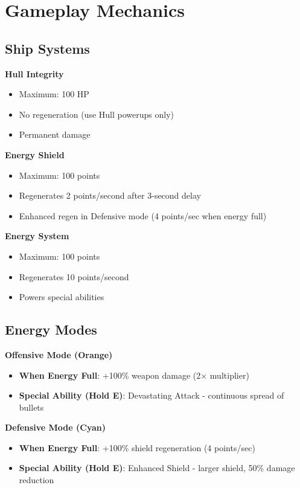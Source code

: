\documentclass[11pt,a4paper]{article}
\begin{document}
\section{Gameplay Mechanics}

\subsection{Ship Systems}

\textbf{Hull Integrity}
\begin{itemize}
    \item Maximum: 100 HP
    \item No regeneration (use Hull powerups only)
    \item Permanent damage
\end{itemize}

\textbf{Energy Shield}
\begin{itemize}
    \item Maximum: 100 points
    \item Regenerates 2 points/second after 3-second delay
    \item Enhanced regen in Defensive mode (4 points/sec when energy full)
\end{itemize}

\textbf{Energy System}
\begin{itemize}
    \item Maximum: 100 points
    \item Regenerates 10 points/second
    \item Powers special abilities
\end{itemize}

\subsection{Energy Modes}

\textbf{Offensive Mode (Orange)}
\begin{itemize}
    \item \textbf{When Energy Full}: +100\% weapon damage (2× multiplier)
    \item \textbf{Special Ability (Hold E)}: Devastating Attack - continuous spread of bullets
\end{itemize}

\textbf{Defensive Mode (Cyan)}
\begin{itemize}
    \item \textbf{When Energy Full}: +100\% shield regeneration (4 points/sec)
    \item \textbf{Special Ability (Hold E)}: Enhanced Shield - larger shield, 50\% damage reduction
\end{itemize}
\end{document}
